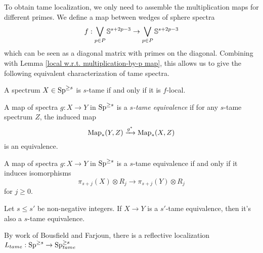 To obtain tame localization, we only need to assemble the multiplication maps for different primes.
We define a map between wedges of sphere spectra
\begin{equation}
\label{f}
	f: \bigvee_{p\in P}{\mathbb{S}}^{s+2p-3} \to \bigvee_{p\in P}{\mathbb{S}}^{s+2p-3}
\end{equation}
which can be seen as a diagonal matrix with primes on the diagonal. Combining with Lemma \ref{local w.r.t. multiplication-by-p map}, this allows us to give the following equivalent characterization of tame spectra.
\begin{corollary}
	A spectrum $X\in \operatorname{Sp}^{\geq s}$ is $s$-tame if and only if it is $f$-local.
\end{corollary}






\begin{definition}
	A map of spectra $g:X\to Y$ in $\operatorname{Sp}^{\geq s}$ is a \emph{$s$-tame equivalence} if for any $s$-tame spectrum $Z$, the induced map
	\[
	\operatorname{Map}_*(Y,Z) \xrightarrow{g^*} \operatorname{Map}_*(X,Z)
	\]
	is an equivalence.
\end{definition}



\begin{proposition}
	A map of spectra $g:X\to Y$ in $\operatorname{Sp}^{\geq s}$ is a $s$-tame equivalence if and only if it induces isomorphisms
	\[
	\pi_{s+j}(X)\otimes R_j \to \pi_{s+j}(Y) \otimes R_j
	\]
	for $j\geq 0$.
\end{proposition}





\begin{remark}
	Let $s\leq s'$ be non-negative integers.
	If $X\to Y$ is a $s'$-tame equivalence, then it's also a $s$-tame equivalence.
\end{remark}

By work of Bousfield and Farjoun, there is a reflective localization $L_{tame}: \operatorname{Sp}^{\geq s} \to \operatorname{Sp}^{\geq s}_{tame}$


